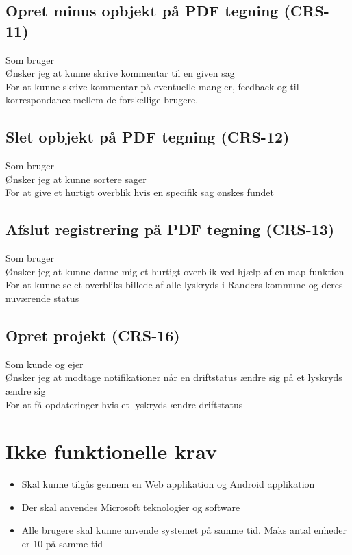 	\subsection*{Opret minus opbjekt på PDF tegning (CRS-11)}
	Som bruger\\
	Ønsker jeg at kunne skrive kommentar til en given sag\\
	For at kunne skrive kommentar på eventuelle mangler, feedback og til korrespondance mellem de forskellige brugere.

	\subsection*{Slet opbjekt på PDF tegning (CRS-12)}
	Som bruger\\
	Ønsker jeg at kunne sortere sager\\
	For at give et hurtigt overblik hvis en specifik sag ønskes fundet

	\subsection*{Afslut registrering på PDF tegning (CRS-13)}
	Som bruger\\
	Ønsker jeg at kunne danne mig et hurtigt overblik ved hjælp af en map funktion\\
	For at kunne se et overbliks billede af alle lyskryds i Randers kommune  og deres nuværende status
	
	\subsection*{Opret projekt (CRS-16)}
	Som kunde og ejer\\
	Ønsker jeg at modtage notifikationer når en driftstatus ændre sig på et lyskryds ændre sig\\
	For at få opdateringer hvis et lyskryds ændre driftstatus \\
	

	\section{Ikke funktionelle krav}
	\begin{itemize}[-]
		\itemsep 0.3em 
		\item Skal kunne tilgås gennem en Web applikation og Android applikation
		\item Der skal anvendes Microsoft teknologier og software
		\item Alle brugere skal kunne anvende systemet på samme tid. Maks antal enheder er 10 på samme tid %
	\end{itemize}


